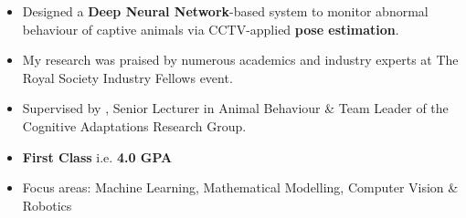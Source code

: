 \documentclass[10pt,a4paper,ragged2e,withhyper]{altacv}
\begin{document}
\begin{paracol}{2}



\begin{itemize}
    \item Designed a \textbf{Deep Neural Network}-based system to monitor abnormal behaviour of captive animals via CCTV-applied \textbf{pose estimation}.
    \item My research was praised by numerous academics and industry experts at The Royal Society Industry Fellows event.
    \item Supervised by , Senior Lecturer in Animal Behaviour \& Team Leader of the Cognitive Adaptations Research Group.
\end{itemize}




\begin{itemize}
    \item \textbf{First Class} i.e. \textbf{4.0 GPA}
    \item Focus areas: Machine Learning, Mathematical Modelling, Computer Vision \& Robotics
\end{itemize}


\end{paracol}
\end{document}
